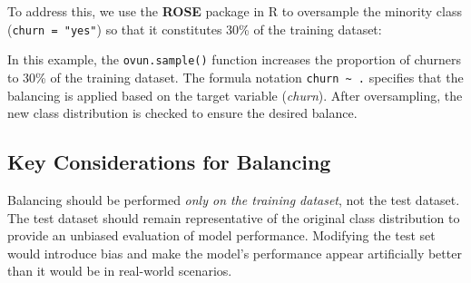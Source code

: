 \documentclass[
  11pt,
]{book}
\makeatletter
\newenvironment{Shaded}{}{}
\newcommand{\AttributeTok}[1]{#1}
\newcommand{\CommentTok}[1]{\textcolor[rgb]{0.36,0.36,0.36}{#1}}
\newcommand{\DecValTok}[1]{#1}
\newcommand{\FloatTok}[1]{#1}
\newcommand{\FunctionTok}[1]{#1}
\newcommand{\NormalTok}[1]{#1}
\newcommand{\OtherTok}[1]{\textcolor[rgb]{0.39,0.39,0.39}{#1}}
\newcommand{\SpecialCharTok}[1]{\textcolor[rgb]{0.39,0.39,0.39}{#1}}
\newcommand{\StringTok}[1]{\textcolor[rgb]{0.39,0.39,0.39}{#1}}
\newenvironment{kframe}{%
\medskip{}
\setlength{\fboxsep}{.8em}
 \def\at@end@of@kframe{}%
 \ifinner\ifhmode%
  \def\at@end@of@kframe{\end{minipage}}%
  \begin{minipage}{\columnwidth}%
 \fi\fi%
 \def\FrameCommand##1{\hskip\@totalleftmargin \hskip-\fboxsep
 \colorbox{shadecolor}{##1}\hskip-\fboxsep
     \hskip-\linewidth \hskip-\@totalleftmargin \hskip\columnwidth}%
 \MakeFramed {\advance\hsize-\width
   \@totalleftmargin\z@ \linewidth\hsize
   \@setminipage}}%
 {\par\unskip\endMakeFramed%
 \at@end@of@kframe}
\renewenvironment{Shaded}{\begin{kframe}}{\end{kframe}}
\theoremstyle{definition}
\theoremstyle{definition}
\theoremstyle{definition}
\theoremstyle{definition}
\theoremstyle{remark}
\makeatother
\begin{document}
To address this, we use the \textbf{ROSE} package in R to oversample the minority class (\texttt{churn\ =\ "yes"}) so that it constitutes 30\% of the training dataset:

\begin{Shaded}
\end{Shaded}

In this example, the \texttt{ovun.sample()} function increases the proportion of churners to 30\% of the training dataset. The formula notation \texttt{churn\ \textasciitilde{}\ .} specifies that the balancing is applied based on the target variable (\emph{churn}). After oversampling, the new class distribution is checked to ensure the desired balance.

\subsection*{Key Considerations for Balancing}\label{key-considerations-for-balancing}


Balancing should be performed \emph{only on the training dataset}, not the test dataset. The test dataset should remain representative of the original class distribution to provide an unbiased evaluation of model performance. Modifying the test set would introduce bias and make the model's performance appear artificially better than it would be in real-world scenarios.
\end{document}
